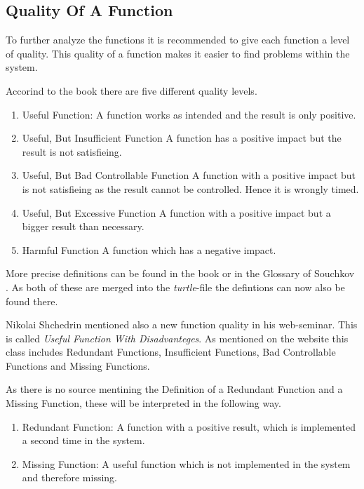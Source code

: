 \subsection{Quality Of A Function}

To further analyze the functions it is recommended to give each function a level of quality.
This quality of a function makes it easier to find problems within the system.

Accorind to the book there are five different quality levels.

\begin{enumerate}
    \item Useful Function: \newline
        A function works as intended and the result is only positive.
    \item Useful, But Insufficient Function \newline
        A function has a positive impact but the result is not satisfieing.
    \item Useful, But Bad Controllable Function \newline
        A function with a positive impact but is not satisfieing as the result cannot be controlled.
        Hence it is wrongly timed.
    \item Useful, But Excessive Function \newline
        A function with a positive impact but a bigger result than necessary.
    \item Harmful Function \newline
        A function which has a negative impact.
\end{enumerate}

More precise definitions can be found in the book \cite{KS} or in the Glossary of Souchkov \cite{SouchkovGlossary}.
As both of these are merged into the \textit{turtle}-file the defintions can now also be found there.

Nikolai Shchedrin mentioned also a new function quality in his web-seminar. 
This is called \textit{Useful Function With Disadvanteges}.
As mentioned on the website \cite{ShchedrinUsefulFunctionDisadvantage} this class includes Redundant Functions, Insufficient Functions, Bad Controllable Functions and Missing Functions.

As there is no source mentining the Definition of a Redundant Function and a Missing Function, these will be interpreted in the following way.

\begin{enumerate}
    \item Redundant Function: \newline
        A function with a positive result, which is implemented a second time in the system.
    \item Missing Function: \newline
        A useful function which is not implemented in the system and therefore missing.
\end{enumerate}

